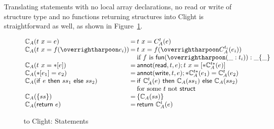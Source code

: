 Translating  statements with no local array declarations, no read
or write of structure type and no functions returning structures into
Clight is straightforward as well, as shown in
Figure~\ref{fig:cstar-2-to-clight-stmt}.

\begin{figure}
  \[
  \arraycolsep=1pt
  \begin{array}{lcl}
    \mathbb C_A (t ~ x = e) & = & t ~ x = C^t_A(e) \\
    \mathbb C_A (t ~ x = f(\ls{e_i})) & = & t ~ x = f(\ls{C^{t_i}_A(e_i)}) \\
    & & \text{if} ~ f ~ \text{is} ~ \kw{fun}(\ls{(\_ : t_i)}) : \_ \{ \_ \} \\
    \mathbb C_A (t ~ x = \eread{e}) & = & \clannot(\symread,t,e) ; t ~ x = [*\mathbb C^{t*}_A (e) ] \\
    \mathbb C_A (\ewrite{e_1}{e_2}) & = & \clannot(\symwrite,t,e) ; *\mathbb C^{t*}_A(e_1) = \mathbb C^{t}_A(e_2) \\
    \mathbb C_A (\eifthenelse{e}{ss_1}{ss_2}) & = & \eifthenelse{\mathbb C^t_A (e) }{\mathbb C_A(ss_1)}{\mathbb C_A(ss_2)} \\
    & & \text{for some} ~ t ~ \text{not} ~ \kw{struct} \\
    \mathbb C_A ( \{ ss \} ) & = & \{ \mathbb C_A (ss) \} \\
    \mathbb C_A ( \kw{return} ~ e ) & = & \kw{return} ~ \mathbb C^t_A(e) \\
  \end{array}
  \]
  \caption{ to Clight: Statements}
  \label{fig:cstar-2-to-clight-stmt}
\end{figure}

